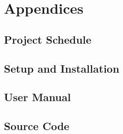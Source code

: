 \chapter{Appendices}

\section{Project Schedule}

\section{Setup and Installation}

\section{User Manual}

\section{Source Code}